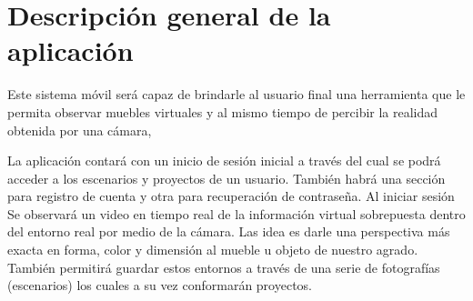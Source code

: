 \section{Descripción general de la aplicación}
Este sistema móvil será capaz de  brindarle al usuario final una herramienta que le permita observar muebles virtuales y al mismo tiempo de percibir la realidad obtenida por una cámara,\par

La aplicación contará con un inicio de sesión inicial a través del cual se podrá acceder a los escenarios y proyectos de un usuario. También habrá una sección para registro de cuenta y otra para recuperación de contraseña.
Al iniciar sesión
Se observará un video en tiempo real de la información virtual sobrepuesta dentro del entorno real por medio de la cámara. Las idea es darle una perspectiva más exacta en forma, color y dimensión al mueble u objeto de nuestro agrado. También permitirá guardar estos entornos a través de una serie de fotografías (escenarios) los cuales a su vez conformarán proyectos.

